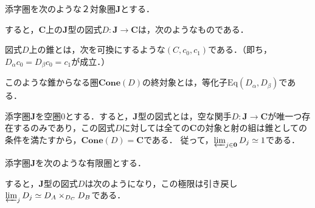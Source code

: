 \documentclass[uplatex, 12pt, dvipdfmx]{jsarticle}
\begin{document}
\begin{example}[等化子]\label{example-equalizer}
    添字圏を次のような２対象圏$\mathbf{J}$とする．
    \begin{center}
    \end{center}
    すると，$\mathbf{C}$上の$\mathbf{J}$型の図式$D:\mathbf{J}\to\mathbf{C}$は，次のようなものである．
    \begin{center}
    \end{center}
    図式$D$上の錐とは，次を可換にするような$(C,c_0,c_1)$である．（即ち，$D_\alpha c_0=D_\beta c_0=c_1$が成立．）
    \begin{center}
    \end{center}
    このような錐からなる圏$\mathbf{Cone}(D)$の終対象とは，等化子$\mathrm{Eq}(D_\alpha,D_\beta)$である．
\end{example}

\vspace{3cm}

\begin{example}[終対象]
    添字圏$\mathbf{J}$を空圏$0$とする．すると，$\mathbf{J}$型の図式とは，空な関手$D:\mathbf{J}\to\mathbf{C}$が唯一つ存在するのみであり，この図式$D$に対しては全ての$\mathbf{C}$の対象と射の組は錐としての条件を満たすから，$\mathbf{Cone}(D)=\mathbf{C}$である．
    従って，$\varprojlim_{j\in\mathbf{0}}D_j\simeq 1$である．
\end{example}

\vspace{3cm}

\begin{example}[引き戻し]
    添字圏$\mathbf{J}$を次のような有限圏とする．
    \begin{center}
    \end{center}
    すると，$\mathbf{J}$型の図式$D$は次のようになり，この極限は引き戻し$\varprojlim_{j}D_j\simeq D_A\times_{D_C}D_B$である．
    \begin{center}
    \end{center}
\end{example}
\end{document}
